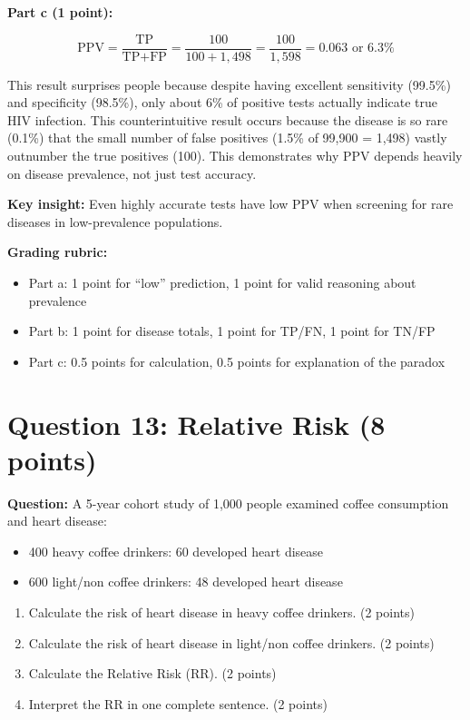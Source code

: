\documentclass[11pt]{article}
\begin{document}
\textbf{Part c (1 point):}

\[\text{PPV} = \frac{\text{TP}}{\text{TP} + \text{FP}} = \frac{100}{100 + 1{,}498} = \frac{100}{1{,}598} = 0.063 \text{ or } 6.3\%\]

This result surprises people because despite having excellent sensitivity (99.5\%) and specificity (98.5\%), only about 6\% of positive tests actually indicate true HIV infection. This counterintuitive result occurs because the disease is so rare (0.1\%) that the small number of false positives (1.5\% of 99,900 = 1,498) vastly outnumber the true positives (100). This demonstrates why PPV depends heavily on disease prevalence, not just test accuracy.

\textbf{Key insight:} Even highly accurate tests have low PPV when screening for rare diseases in low-prevalence populations.

\textbf{Grading rubric:}
\begin{itemize}
    \item Part a: 1 point for ``low'' prediction, 1 point for valid reasoning about prevalence
    \item Part b: 1 point for disease totals, 1 point for TP/FN, 1 point for TN/FP
    \item Part c: 0.5 points for calculation, 0.5 points for explanation of the paradox
\end{itemize}

\vspace{0.3cm}
\noindent\hrulefill

\section*{Question 13: Relative Risk (8 points)}

\textbf{Question:} A 5-year cohort study of 1,000 people examined coffee consumption and heart disease:
\begin{itemize}
    \item 400 heavy coffee drinkers: 60 developed heart disease
    \item 600 light/non coffee drinkers: 48 developed heart disease
\end{itemize}

\begin{enumerate}
    \item[a)] Calculate the risk of heart disease in heavy coffee drinkers. (2 points)
    \item[b)] Calculate the risk of heart disease in light/non coffee drinkers. (2 points)
    \item[c)] Calculate the Relative Risk (RR). (2 points)
    \item[d)] Interpret the RR in one complete sentence. (2 points)
\end{enumerate}
\end{document}
